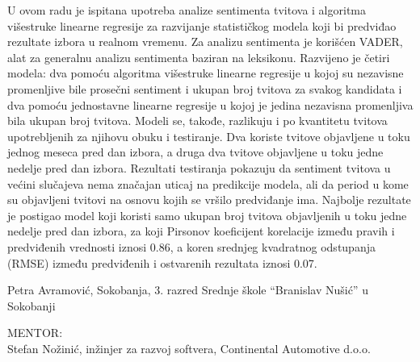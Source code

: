 \begin{Abstract}
U ovom radu je ispitana upotreba analize sentimenta tvitova i algoritma višestruke linearne regresije
za razvijanje statističkog modela koji bi predviđao rezultate izbora u realnom vremenu. Za analizu
sentimenta je korišćen VADER, alat za generalnu analizu sentimenta baziran na leksikonu. Razvijeno
je četiri modela: dva pomoću algoritma višestruke linearne regresije u kojoj su nezavisne promenljive
bile prosečni sentiment i ukupan broj tvitova za svakog kandidata i dva pomoću jednostavne linearne
regresije u kojoj je jedina nezavisna promenljiva bila ukupan broj tvitova. Modeli se, takođe, razlikuju
i po kvantitetu tvitova upotrebljenih za njihovu obuku i testiranje. Dva koriste tvitove objavljene u
toku jednog meseca pred dan izbora, a druga dva tvitove objavljene u toku jedne nedelje pred dan
izbora. Rezultati testiranja pokazuju da sentiment tvitova u većini slučajeva nema značajan uticaj na
predikcije modela, ali da period u kome su objavljeni tvitovi na osnovu kojih se vršilo predviđanje
ima. Najbolje rezultate je postigao model koji koristi samo ukupan broj tvitova objavljenih u toku
jedne nedelje pred dan izbora, za koji Pirsonov koeficijent korelacije između pravih i predviđenih
vrednosti iznosi 0.86, a koren srednjeg kvadratnog odstupanja (RMSE) između predviđenih i
ostvarenih rezultata iznosi 0.07.
\end{Abstract}
\begin{AuthorEx}
Petra Avramović, Sokobanja, 3. razred Srednje škole “Branislav Nušić” u Sokobanji

MENTOR:\\
Stefan Nožinić, inžinjer za razvoj softvera, Continental Automotive d.o.o.
\end{AuthorEx}
